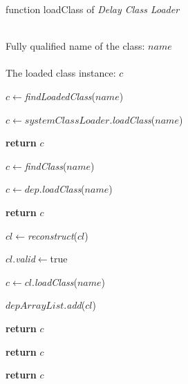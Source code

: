\documentclass[conference]{IEEEtran}
\begin{document}
\begin{algorithm}[ht]
\caption{function loadClass of \emph{Delay Class Loader}}
\label{alg:Delay_Class_Loader}
\begin{algorithmic}[1]
\REQUIRE ~~\\
Fully qualified name of the class: $name$ \\

\ENSURE ~~\\
The loaded class instance: $c$

\STATE $c\leftarrow$\emph{findLoadedClass}($name$)

	
	
		\STATE $c\leftarrow systemClassLoader.$\emph{loadClass}($name$)
	

			\STATE \textbf{return} $c$
	
		\ENDIF

	\ELSE

		\STATE $c\leftarrow$\emph{findClass}($name$)



				\STATE $c\leftarrow dep.$\emph{loadClass}($name$)

			
					\STATE \textbf{return} $c$

				\ENDIF
			
			\ENDFOR

				


					\STATE $cl\leftarrow$\emph{reconstruct}($cl$)
				
					\STATE $cl.$\emph{valid}$\leftarrow$true

				\ENDIF

				\STATE $c\leftarrow cl.$\emph{loadClass}($name$)


					\STATE $depArrayList$.\emph{add}($cl$)
			
					\STATE \textbf{return} $c$

				\ENDIF
			
			\ENDFOR
	
	
		\ELSE

			\STATE \textbf{return} $c$

		\ENDIF

	\ENDIF

\ELSE

	\STATE \textbf{return} $c$

\ENDIF


\end{algorithmic}
\end{algorithm}
\end{document}
